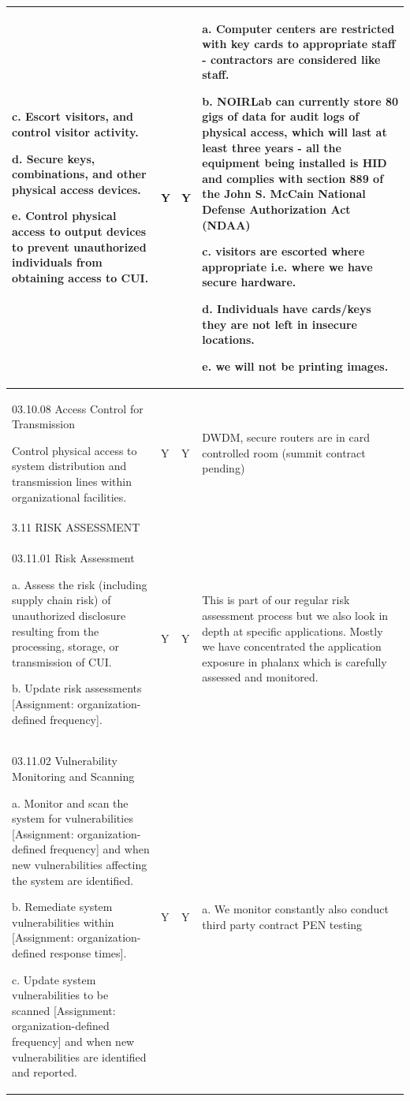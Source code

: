 \begin{longtable} {|p{}|p{}|p{}|p{} |}
{c. Escort visitors, and control visitor activity.

d. Secure keys, combinations, and other physical access devices.

e. Control physical access to output devices to prevent unauthorized individuals from obtaining access to CUI.}&{Y}&{Y}&{a.   Computer centers are restricted with key cards to appropriate staff - contractors are considered like staff.

b. NOIRLab can currently store 80 gigs of data for audit logs of physical access, which will last at least three years -  all the equipment being installed is HID and complies with section 889 of the John S. McCain National Defense Authorization Act (NDAA)

c. visitors are escorted where appropriate i.e. where we have secure hardware.

d. Individuals have cards/keys they are not left in insecure locations.

e. we will not be printing images.} \\ \hline
{03.10.08 Access Control for Transmission

Control physical access to system distribution and transmission lines within organizational facilities.}&{Y}&{Y}&{DWDM, secure routers are in card controlled room (summit contract pending)} \\ \hline
{3.11 RISK ASSESSMENT}&&& \\ \hline
{03.11.01 Risk Assessment

a. Assess the risk (including supply chain risk) of unauthorized disclosure resulting from the processing, storage, or transmission of CUI.

b. Update risk assessments [Assignment: organization-defined frequency].}&{Y}&{Y}&{This is part of our regular risk assessment process but we also look in depth at specific applications. Mostly we have concentrated the application exposure in phalanx which is carefully assessed and monitored.} \\ \hline
{03.11.02 Vulnerability Monitoring and Scanning

a. Monitor and scan the system for vulnerabilities [Assignment: organization- defined frequency] and when new vulnerabilities affecting the system are identified.

b. Remediate system vulnerabilities within [Assignment: organization-defined response times].

c. Update system vulnerabilities to be scanned [Assignment: organization-defined frequency] and when new vulnerabilities are identified and reported.}&{Y}&{Y}&{a. We monitor constantly also conduct third party contract PEN testing

}
\end{longtable}
